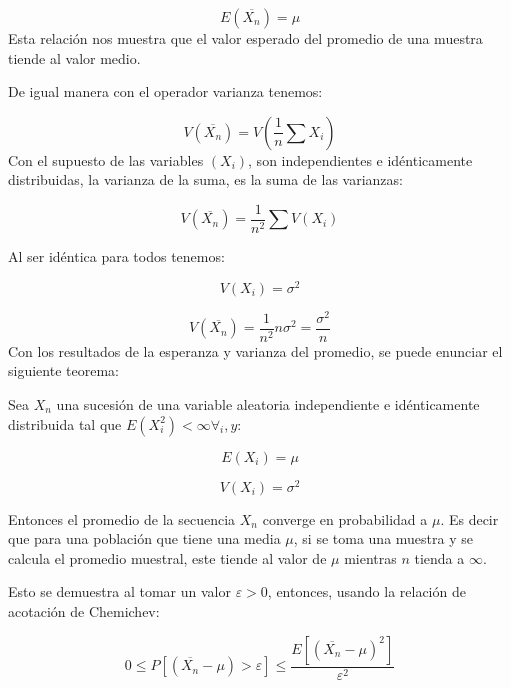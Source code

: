 \documentclass{rbf}
\begin{document}
\begin{equation}
  \displaystyle  E(\overline{X_n})=\mu
\end{equation}
Esta relación nos muestra que el valor esperado del promedio de una muestra tiende al valor medio.

De igual manera con el operador varianza tenemos:

\begin{equation}
  \displaystyle   V(\overline{X_n})=V(\frac{1}{n} \sum X_i)
\end{equation}
Con el supuesto de las variables $(X_i)$, son independientes e idénticamente distribuidas, la varianza de la suma, es la suma de las varianzas:

\begin{equation}
  \displaystyle  V(\overline{X_n})=\frac{1}{n^2} \sum V(X_i)
\end{equation}

Al ser idéntica para todos tenemos:

\begin{equation}
 \displaystyle   V({X_i})=\sigma^2
\end{equation}

\begin{equation}
   \displaystyle  V(\overline{X_n})=\frac{1}{n^2} n\sigma^2 =\frac{\sigma^2}{n}
\end{equation}
Con los resultados de la esperanza y varianza del promedio, se puede enunciar el siguiente teorema: 

Sea $X_n$ una sucesión de una variable aleatoria independiente e idénticamente distribuida tal que $E(X_i^2 )<\infty  \forall_i ,y:$

\begin{equation}
  \displaystyle   E({X_i})=\mu
\end{equation}

\begin{equation}
 \displaystyle    V({X_i})=\sigma^2
\end{equation}

Entonces el promedio de la secuencia $X_n$ converge en probabilidad a $\mu$. Es decir que para una población que tiene una media $\mu$, si se toma una muestra y se calcula el promedio muestral, este tiende al valor de $\mu$ mientras $n$ tienda a $\infty$. 

Esto se demuestra al tomar un valor $\varepsilon> 0$, entonces, usando la relación de acotación de Chemichev:

\begin{equation}
  \displaystyle   0\leq P[(\overline{X_n}-\mu)>\varepsilon] \leq \frac{E[(\overline{X_n}-\mu)^2]}{\varepsilon^2}
\end{equation}
\end{document}

